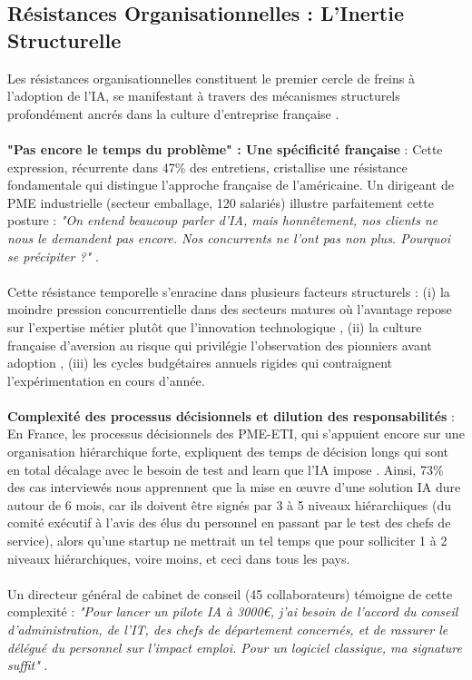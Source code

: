 \subsection{Résistances Organisationnelles : L'Inertie Structurelle}

Les résistances organisationnelles constituent le premier cercle de freins à l'adoption de l'IA, se manifestant à travers des mécanismes structurels profondément ancrés dans la culture d'entreprise française \cite{hofstede2001culture}.
\\\\
\textbf{"Pas encore le temps du problème" : Une spécificité française} : Cette expression, récurrente dans 47\% des entretiens, cristallise une résistance fondamentale qui distingue l'approche française de l'américaine. Un dirigeant de PME industrielle (secteur emballage, 120 salariés) illustre parfaitement cette posture : \emph{"On entend beaucoup parler d'IA, mais honnêtement, nos clients ne nous le demandent pas encore. Nos concurrents ne l'ont pas non plus. Pourquoi se précipiter ?"} \cite{luwai2025meetings}. 
\\\\
Cette résistance temporelle s'enracine dans plusieurs facteurs structurels : (i) la moindre pression concurrentielle dans des secteurs matures où l'avantage repose sur l'expertise métier plutôt que l'innovation technologique \cite{porter1985competitive}, (ii) la culture française d'aversion au risque qui privilégie l'observation des pionniers avant adoption \cite{meyer2014culture}, (iii) les cycles budgétaires annuels rigides qui contraignent l'expérimentation en cours d'année.
\\\\
\textbf{Complexité des processus décisionnels et dilution des responsabilités} : En France, les processus décisionnels des PME-ETI, qui s’appuient encore sur une organisation hiérarchique forte, expliquent des temps de décision longs qui sont en total décalage avec le besoin de test and learn que l’IA impose \cite{bureaucratie2024french}. Ainsi, 73\% des cas interviewés nous apprennent que la mise en œuvre d’une solution IA dure autour de 6 mois, car ils doivent être signés par 3 à 5 niveaux hiérarchiques (du comité exécutif à l’avis des élus du personnel en passant par le test des chefs de service), alors qu’une startup ne mettrait un tel temps que pour solliciter 1 à 2 niveaux hiérarchiques, voire moins, et ceci dans tous les pays.
\\\\
Un directeur général de cabinet de conseil (45 collaborateurs) témoigne de cette complexité : \emph{"Pour lancer un pilote IA à 3000€, j'ai besoin de l'accord du conseil d'administration, de l'IT, des chefs de département concernés, et de rassurer le délégué du personnel sur l'impact emploi. Pour un logiciel classique, ma signature suffit"} \cite{luwai2025meetings}.
